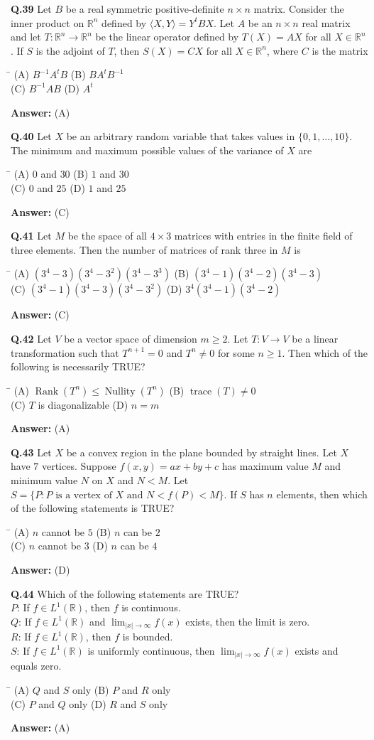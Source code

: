 \documentclass[11pt,a4paper]{article}
\newcommand{\optsfourA}[4]{%
  \begin{tabbing}
    \hspace{0.48\linewidth}\=\kill
    (A) #1 \> (B) #2 \\[2pt]
    (C) #3 \> (D) #4
  \end{tabbing}%
}
\newcommand{\ans}[1]{\textbf{Answer:} #1\par\medskip}
\begin{document}
\textbf{Q.39} Let $B$ be a real symmetric positive-definite $n \times n$ matrix. Consider the inner product on $\mathbb{R}^n$ defined by $\langle X, Y \rangle = Y^t B X$. Let $A$ be an $n \times n$ real matrix and let $T : \mathbb{R}^n \to \mathbb{R}^n$ be the linear operator defined by $T(X) = AX$ for all $X \in \mathbb{R}^n$. If $S$ is the adjoint of $T$, then $S(X) = CX$ for all $X \in \mathbb{R}^n$, where $C$ is the matrix
\optsfourA{$B^{-1} A^t B$}{$B A^t B^{-1}$}{$B^{-1} A B$}{$A^t$}
\ans{(A)}

\textbf{Q.40} Let $X$ be an arbitrary random variable that takes values in $\{0, 1, \dots, 10\}$. The minimum and maximum possible values of the variance of $X$ are
\optsfourA{$0$ and $30$}{$1$ and $30$}{$0$ and $25$}{$1$ and $25$}
\ans{(C)}

\textbf{Q.41} Let $M$ be the space of all $4 \times 3$ matrices with entries in the finite field of three elements. Then the number of matrices of rank three in $M$ is
\optsfourA{$(3^4 - 3)(3^4 - 3^2)(3^4 - 3^3)$}{$(3^4 - 1)(3^4 - 2)(3^4 - 3)$}{$(3^4 - 1)(3^4 - 3)(3^4 - 3^2)$}{$3^4(3^4 - 1)(3^4 - 2)$}
\ans{(C)}

\textbf{Q.42} Let $V$ be a vector space of dimension $m \ge 2$. Let $T : V \to V$ be a linear transformation such that $T^{n+1} = 0$ and $T^n \ne 0$ for some $n \ge 1$. Then which of the following is necessarily TRUE?
\optsfourA{$\operatorname{Rank}(T^n) \le \operatorname{Nullity}(T^n)$}{$\operatorname{trace}(T) \ne 0$}{$T$ is diagonalizable}{$n = m$}
\ans{(A)}

\textbf{Q.43} Let $X$ be a convex region in the plane bounded by straight lines. Let $X$ have $7$ vertices. Suppose $f(x, y) = ax + by + c$ has maximum value $M$ and minimum value $N$ on $X$ and $N < M$. Let $S = \{P : P \text{ is a vertex of } X \text{ and } N < f(P) < M\}$. If $S$ has $n$ elements, then which of the following statements is TRUE?
\optsfourA{$n$ cannot be $5$}{$n$ can be $2$}{$n$ cannot be $3$}{$n$ can be $4$}
\ans{(D)}

\textbf{Q.44} Which of the following statements are TRUE?\\
$P$: If $f \in L^1(\mathbb{R})$, then $f$ is continuous.\\
$Q$: If $f \in L^1(\mathbb{R})$ and $\lim_{|x|\to\infty} f(x)$ exists, then the limit is zero.\\
$R$: If $f \in L^1(\mathbb{R})$, then $f$ is bounded.\\
$S$: If $f \in L^1(\mathbb{R})$ is uniformly continuous, then $\lim_{|x|\to\infty} f(x)$ exists and equals zero.
\optsfourA{$Q$ and $S$ only}{$P$ and $R$ only}{$P$ and $Q$ only}{$R$ and $S$ only}
\ans{(A)}
\end{document}
